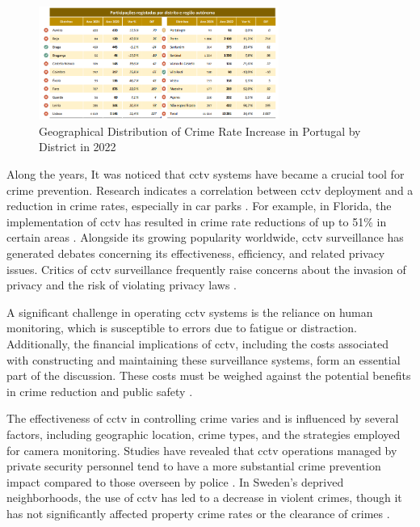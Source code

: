\begin{figure}[h]
    \centering 
    \includegraphics[width=0.7\textwidth]{figs/geo-crimes-rate.png} 
    \caption{Geographical Distribution of Crime Rate Increase in Portugal by District in 2022 \cite{rfc41}}
    \label{fig:geo-crimes}
\end{figure}

Along the years, It was noticed that \ac{cctv} systems have became a 
crucial tool for crime prevention. Research indicates a 
correlation between \ac{cctv} deployment and a reduction in crime rates, especially in car parks 
\cite{rfc33}. For example, in Florida, the implementation of \ac{cctv} has resulted in 
crime rate reductions of up to 51\% in certain areas \cite{rfc34}. Alongside its growing 
popularity worldwide, \ac{cctv} surveillance has generated debates concerning its effectiveness, efficiency, and 
related privacy issues. Critics of \ac{cctv} surveillance frequently raise concerns about the invasion of privacy 
and the risk of violating privacy laws \cite{rfc38}.

A significant challenge in operating \ac{cctv} systems is the reliance on human monitoring, which is susceptible to errors due to fatigue or distraction. Additionally, the financial implications of \ac{cctv}, including the costs associated with constructing and maintaining these surveillance systems, form an essential part of the discussion. These costs must be weighed against the potential benefits in crime reduction and public safety \cite{rfc38}. 

The effectiveness of \ac{cctv} in controlling crime varies and is influenced by several factors, including geographic location, crime types, and the strategies employed for camera monitoring. Studies have revealed that \ac{cctv} operations managed by private security personnel tend to have a more substantial crime prevention impact compared to those overseen by police \cite{rfc36}. In Sweden's deprived neighborhoods, the use of \ac{cctv} has led to a decrease in violent crimes, though it has not significantly affected property crime rates or the clearance of crimes \cite{rfc35}.

